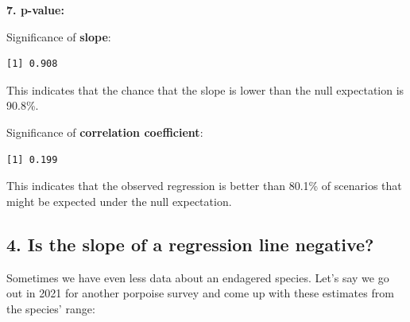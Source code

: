 \documentclass[
]{book}
\newenvironment{Shaded}{\begin{snugshade}}{\end{snugshade}}
\newcommand{\DecValTok}[1]{\textcolor[rgb]{0.00,0.00,0.81}{#1}}
\newcommand{\KeywordTok}[1]{\textcolor[rgb]{0.13,0.29,0.53}{\textbf{#1}}}
\newcommand{\NormalTok}[1]{#1}
\newcommand{\OperatorTok}[1]{\textcolor[rgb]{0.81,0.36,0.00}{\textbf{#1}}}
\newcommand{\StringTok}[1]{\textcolor[rgb]{0.31,0.60,0.02}{#1}}
\begin{document}
\textbf{7. p-value:}

Significance of \textbf{slope}:

\begin{Shaded}
\end{Shaded}

\begin{verbatim}
[1] 0.908
\end{verbatim}

This indicates that the chance that the slope is lower than the null expectation is 90.8\%.

Significance of \textbf{correlation coefficient}:

\begin{Shaded}
\end{Shaded}

\begin{verbatim}
[1] 0.199
\end{verbatim}

This indicates that the observed regression is better than 80.1\% of scenarios that might be expected under the null expectation.

\hypertarget{is-the-slope-of-a-regression-line-negative}{%
\subsection*{4. Is the slope of a regression line negative?}\label{is-the-slope-of-a-regression-line-negative}}

Sometimes we have even less data about an endagered species. Let's say we go out in 2021 for another porpoise survey and come up with these estimates from the species' range:
\end{document}
